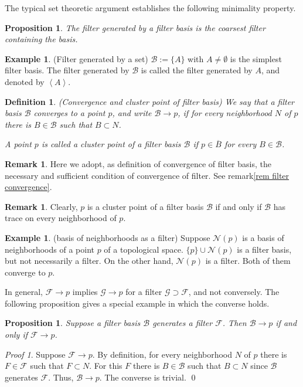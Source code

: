 \documentclass[a4paper,12pt]{article}
\newtheorem{prp}[thm]{Proposition}
\newtheorem{dfn}[thm]{Definition}
\theoremstyle{remark}
\newtheorem*{prf}{Proof}
\theoremstyle{definition}
\newtheorem{rem}[thm]{Remark}
\theoremstyle{definition}
\newtheorem{ex}[thm]{Example}
\theoremstyle{definition}
\begin{document}
The typical set theoretic argument establishes the following minimality property.
\begin{prp}\label{coarsest generation}
	The filter generated by a filter basis is the coarsest filter containing the basis.
\end{prp}

\begin{ex} (Filter generated by a set)
	\( \mathscr{B}:=\{A\} \) with \( A \neq \emptyset \) is the simplest filter basis. The filter generated by \( \mathscr{B} \) is called the filter generated by \( A \), and denoted by \( \left< A \right> \).
\end{ex}

\begin{dfn} (Convergence and cluster point of filter basis)
	We say that a filter basis \( \mathscr{B} \) converges to a point \( p \), and write \( \mathscr{B} \to p \), if for every neighborhood \( N \) of \( p \) there is \( B \in \mathscr{B} \) such that \( B \subset N \).

	A point \( p \) is called a cluster point of a filter basis \( \mathscr{B} \) if \( p \in \overline{B} \) for every \( B \in \mathscr{B} \).
\end{dfn}

\begin{rem}
	Here we adopt, as definition of convergence of filter basis, the necessary and sufficient condition of convergence of filter. See remark\ref{rem filter convergence}.
\end{rem}

\begin{rem}
	Clearly, \( p \) is a cluster point of a filter basis \( \mathscr{B} \) if and only if \( \mathscr{B} \) has trace on every neighborhood of \( p \).
\end{rem}

\begin{ex}\label{example local basis} (basis of neighborhoods as a filter)
	Suppose \( \mathscr{N}(p) \) is a basis of neighborhoods of a point \( p \) of a topological space.
	\( \{p\} \cup \mathscr{N}(p) \) is a filter basis, but not necessarily a filter. On the other hand, \( \mathscr{N}(p) \) is a filter. Both of them converge to \( p \).
\end{ex}

In general, \( \mathscr{F}\to p \) implies \( \mathscr{G}\to p \) for a filter \( \mathscr{G} \supset \mathscr{F} \), and not conversely. The following proposition gives a special example in which the converse holds.
\begin{prp}
	Suppose a filter basis \( \mathscr{B} \) generates a filter \( \mathscr{F} \). Then \( \mathscr{B}\to p \) if and only if \( \mathscr{F}\to p \).
\end{prp}
\begin{prf}
	Suppose \( \mathscr{F}\to p \). By definition, for every neighborhood \( N \) of \( p \) there is \( F \in \mathscr{F} \) such that \( F \subset N \). For this \( F \) there is \( B \in \mathscr{B} \) such that \( B \subset N \) since \( \mathscr{B} \) generates \( \mathscr{F} \). Thus, \( \mathscr{B}\to p \). The converse is trivial.
	\qed\end{prf}
\end{document}
